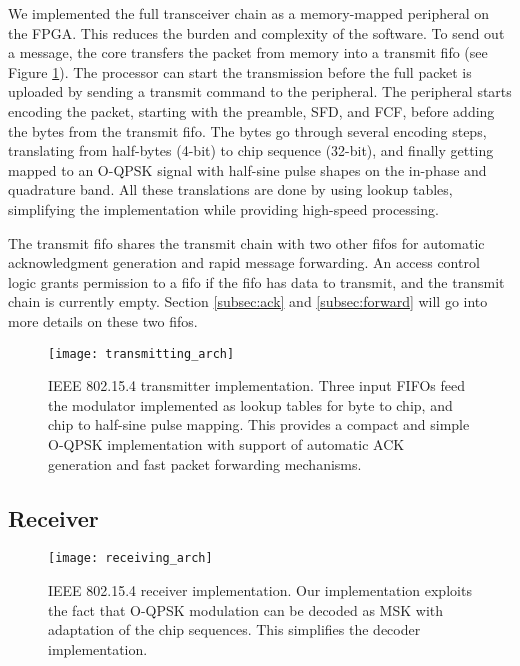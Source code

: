 We implemented the full transceiver chain as a memory-mapped peripheral on the
FPGA. This reduces the burden and complexity of the software. To send out a
message, the core transfers the packet from memory into a transmit fifo (see
Figure \ref{fig:transmitting_chain}). The processor can start the transmission
before the full packet is uploaded by sending a transmit command to the
peripheral. The peripheral starts encoding the packet, starting with the
preamble, SFD, and FCF, before adding the bytes from the transmit fifo. The
bytes go through several encoding steps, translating from half-bytes (4-bit) to
chip sequence (32-bit), and finally getting mapped to an O-QPSK signal with
half-sine pulse shapes on the in-phase and quadrature band. All these
translations are done by using lookup tables, simplifying the implementation
while providing high-speed processing.

The transmit fifo shares the transmit chain with two other fifos for
automatic acknowledgment generation and rapid message forwarding. An access
control logic grants permission to a fifo if the fifo has data to transmit,
and the transmit chain is currently empty. Section \ref{subsec:ack} and
\ref{subsec:forward} will go into more details on these two fifos.

\begin{figure}[bht]
\centering
\texttt{[image: transmitting\_arch]}
\caption{IEEE 802.15.4 transmitter implementation. Three input FIFOs feed the
modulator implemented as lookup tables for byte to chip, and chip to half-sine
pulse mapping. This provides a compact and simple O-QPSK implementation with
support of automatic ACK generation and fast packet forwarding mechanisms.}
\label{fig:transmitting_chain}
\end{figure}

\subsection{Receiver}
 
\begin{figure}[h!]
\centering
\texttt{[image: receiving\_arch]}
\caption{IEEE 802.15.4 receiver implementation. Our implementation exploits
the fact that O-QPSK modulation can be decoded as MSK with adaptation of the
chip sequences. This simplifies the decoder implementation.}
\label{fig:receiving_arch}
\end{figure}

